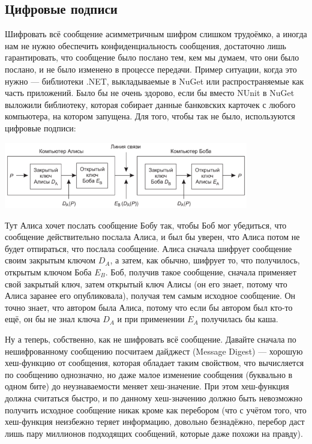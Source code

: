 \documentclass{../mcstext}
\begin{document}
\subsection{Цифровые подписи}

Шифровать всё сообщение асимметричным шифром слишком трудоёмко, а иногда нам не нужно обеспечить конфиденциальность сообщения, достаточно лишь гарантировать, что сообщение было послано тем, кем мы думаем, что они было послано, и не было изменено в процессе передачи. Пример ситуации, когда это нужно --- библиотеки .NET, выкладываемые в NuGet или распространяемые как часть приложений. Было бы не очень здорово, если бы вместо NUnit в NuGet выложили библиотеку, которая собирает данные банковских карточек с любого компьютера, на котором запущена. Для того, чтобы так не было, используются цифровые подписи:

\begin{center}
    \includegraphics[width=0.8\textwidth]{signature.png}
\end{center}

Тут Алиса хочет послать сообщение Бобу так, чтобы Боб мог убедиться, что сообщение действительно послала Алиса, и был бы уверен, что Алиса потом не будет отпираться, что послала сообщение. Алиса сначала шифрует сообщение своим закрытым ключом $D_A$, а затем, как обычно, шифрует то, что получилось, открытым ключом Боба $E_B$. Боб, получив такое сообщение, сначала применяет свой закрытый ключ, затем открытый ключ Алисы (он его знает, потому что Алиса заранее его опубликовала), получая тем самым исходное сообщение. Он точно знает, что автором была Алиса, потому что если бы автором был кто-то ещё, он бы не знал ключа $D_A$ и при применении $E_A$ получилась бы каша.

Ну а теперь, собственно, как не шифровать всё сообщение. Давайте сначала по нешифрованному сообщению посчитаем дайджест (Message Digest) --- хорошую хеш-функцию от сообщения, которая обладает таким свойством, что вычисляется по сообщению однозначно, но даже малое изменение сообщения (буквально в одном бите) до неузнаваемости меняет хеш-значение. При этом хеш-функция должна считаться быстро, и по данному хеш-значению должно быть невозможно получить исходное сообщение никак кроме как перебором (что с учётом того, что хеш-функция неизбежно теряет информацию, довольно безнадёжно, перебор даст лишь пару миллионов подходящих сообщений, которые даже похожи на правду). 
\end{document}
